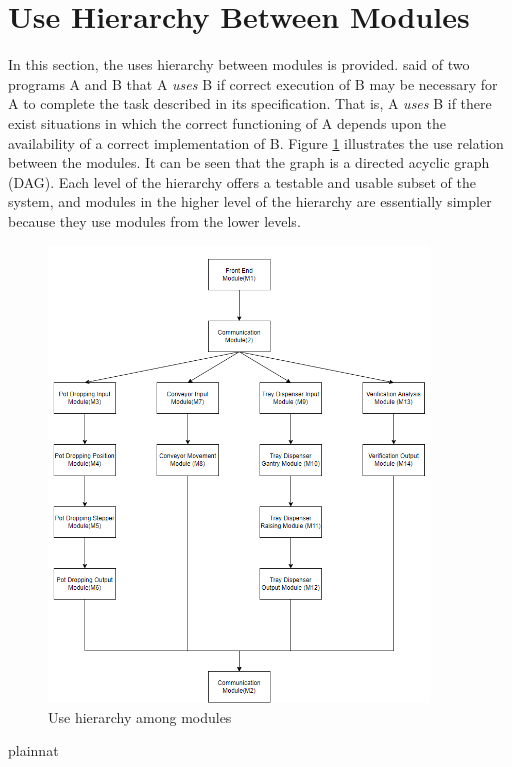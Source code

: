 \documentclass[12pt, titlepage]{article}
\begin{document}
\section{Use Hierarchy Between Modules} \label{SecUse}

In this section, the uses hierarchy between modules is
provided. \citet{Parnas1978} said of two programs A and B that A {\em uses} B if
correct execution of B may be necessary for A to complete the task described in
its specification. That is, A {\em uses} B if there exist situations in which
the correct functioning of A depends upon the availability of a correct
implementation of B.  Figure \ref{FigUH} illustrates the use relation between
the modules. It can be seen that the graph is a directed acyclic graph
(DAG). Each level of the hierarchy offers a testable and usable subset of the
system, and modules in the higher level of the hierarchy are essentially simpler
because they use modules from the lower levels.

\begin{figure}[H]
\centering
\includegraphics[width=0.9\textwidth]{ModuleGuide.png}
\caption{Use hierarchy among modules}
\label{FigUH}
\end{figure}


 {plainnat}


\newpage{}
\end{document}

